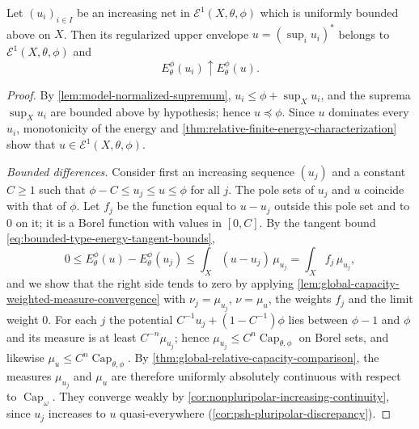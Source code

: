 \begin{proposition}\label{prop:relative-energy-increasing-continuity}
Let $(u_i)_{i\in I}$ be an increasing net in $\mathcal E^1(X,\theta,\phi)$ which is uniformly bounded above on $X$. Then its regularized upper envelope $u=(\sup_i u_i)^*$ belongs to $\mathcal E^1(X,\theta,\phi)$ and
\[
 E_\theta^\phi(u_i)\uparrow E_\theta^\phi(u).
\]
\end{proposition}
\begin{proof}
By \cref{lem:model-normalized-supremum}, $u_i\leq\phi+\sup_Xu_i$, and the suprema $\sup_Xu_i$ are bounded above by hypothesis; hence $u\preceq\phi$. Since $u$ dominates every $u_i$, monotonicity of the energy and \cref{thm:relative-finite-energy-characterization} show that $u\in\mathcal E^1(X,\theta,\phi)$.

\emph{Bounded differences.} Consider first an increasing sequence $(u_j)$ and a constant $C\geq1$ such that $\phi-C\leq u_j\leq u\leq\phi$ for all $j$. The pole sets of $u_j$ and $u$ coincide with that of $\phi$. Let $f_j$ be the function equal to $u-u_j$ outside this pole set and to $0$ on it; it is a Borel function with values in $[0,C]$. By the tangent bound \eqref{eq:bounded-type-energy-tangent-bounds},
\[
 0\leq E_\theta^\phi(u)-E_\theta^\phi(u_j)
                  \leq\int_X(u-u_j)\,\mu_{u_j}=\int_Xf_j\,\mu_{u_j},
\]
and we show that the right side tends to zero by applying \cref{lem:global-capacity-weighted-measure-convergence} with $\nu_j=\mu_{u_j}$, $\nu=\mu_u$, the weights $f_j$ and the limit weight $0$. For each $j$ the potential $C^{-1}u_j+(1-C^{-1})\phi$ lies between $\phi-1$ and $\phi$ and its measure is at least $C^{-n}\mu_{u_j}$; hence $\mu_{u_j}\leq C^n\operatorname{Cap}_{\theta,\phi}$ on Borel sets, and likewise $\mu_u\leq C^n\operatorname{Cap}_{\theta,\phi}$. By \cref{thm:global-relative-capacity-comparison}, the measures $\mu_{u_j}$ and $\mu_u$ are therefore uniformly absolutely continuous with respect to $\operatorname{Cap}_\omega$. They converge weakly by \cref{cor:nonpluripolar-increasing-continuity}, since $u_j$ increases to $u$ quasi-everywhere (\cref{cor:psh-pluripolar-discrepancy}).


\end{proof}
